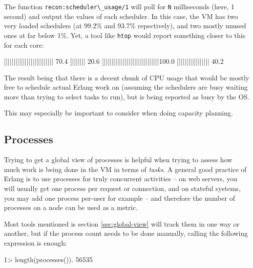\documentclass[11pt, oneside]{book}   	%
\newcommand{\app}[1]{\Verb`#1`}
\newcommand{\function}[1]{\Verb`#1`}
\newcommand{\var}[1]{\Verb`#1`}
\begin{document}
The function \function{recon:scheduler\_usage/1} will poll for \var{N} milliseconds (here, 1 second) and output the values of each scheduler. In this case, the VM has two very loaded schedulers (at 99.2\% and 93.7\% repectively), and two mostly unused ones at far below 1\%. Yet, a tool like \app{htop} would report something closer to this for each core:

\begin{VerbatimText}
[|||||||||||||||||||||||||     70.4%
[|||||||                       20.6%
[|||||||||||||||||||||||||||||100.0%
[||||||||||||||||              40.2%
\end{VerbatimText}

The result being that there is a decent chunk of CPU usage that would be mostly free to schedule actual Erlang work on (assuming the schedulers are busy waiting more than trying to select tasks to run), but is being reported as busy by the OS.

This may especially be important to consider when doing capacity planning.


\subsection{Processes}
\label{subsec:global-procs}

Trying to get a global view of processes is helpful when trying to assess how much work is being done in the VM in terms of \emph{tasks}. A general good practice of Erlang is to use processes for truly concurrent activities -- on web servers, you will usually get one process per request or connection, and on stateful systems, you may add one process per-user for example -- and therefore the number of processes on a node can be used as a metric.

Most tools mentioned is section \ref{sec:global-view} will track them in one way or another, but if the process count needs to be done manually, calling the following expression is enough:

\begin{VerbatimEshell}
1> length(processes()).
56535
\end{VerbatimEshell}
\end{document}
